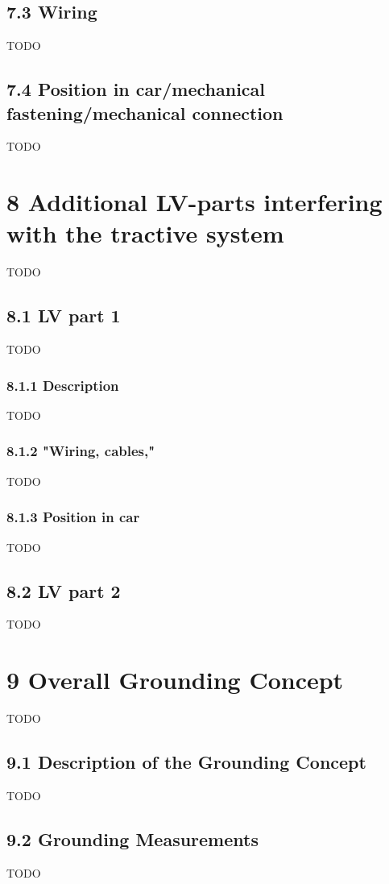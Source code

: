 \documentclass{article}
\begin{document}
\subsection*{7.3 Wiring}
TODO

\subsection*{7.4 Position in car/mechanical fastening/mechanical connection}
TODO

\section*{8 Additional LV-parts interfering with the tractive system}
TODO

\subsection*{8.1 LV part 1}
TODO

\subsubsection*{8.1.1 Description}
TODO

\subsubsection*{8.1.2 "Wiring, cables,"}
TODO

\subsubsection*{8.1.3 Position in car}
TODO

\subsection*{8.2 LV part 2}
TODO

\section*{9 Overall Grounding Concept}
TODO

\subsection*{9.1 Description of the Grounding Concept}
TODO

\subsection*{9.2 Grounding Measurements}
TODO
\end{document}
